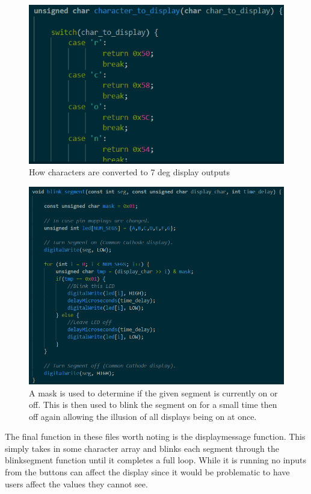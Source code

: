 \documentclass[a4paper,10pt]{article}
\begin{document}
\begin{figure}[H]
  \centering
      \includegraphics[width=\textwidth]{Assets/char_to_display.png}
  \caption{How  characters are converted to 7 deg display outputs}
\end{figure}

\begin{figure}[H]
  \centering
      \includegraphics[width=\textwidth]{Assets/blink_segment.png}
  \caption{A mask is used to determine if the given segment is currently on or off. This is then used to blink the segment on for a small time then off again allowing the illusion of all displays being on at once.}
\end{figure}

The final function in these files worth noting is the display\textunderscore message function. This simply takes in some character array and blinks each segment through the blink\textunderscore segment function until it completes a full loop. While it is running no inputs from the buttons can affect the display since it would be problematic to have users affect the values they cannot see.
\end{document}
